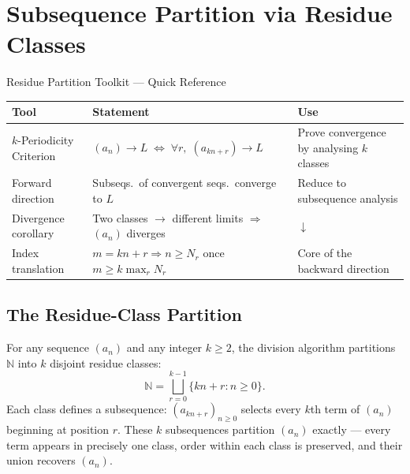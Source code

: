 
\section{Subsequence Partition via Residue Classes}
\label{sec:residue-partition}

\begin{toolkitbox}{Residue Partition Toolkit --- Quick Reference}
\small
\begin{tabular}{l l l}
\toprule
\textbf{Tool} & \textbf{Statement} & \textbf{Use} \\
\midrule
$k$-Periodicity Criterion
  & $(a_n)\to L \;\Leftrightarrow\; \forall r,\;(a_{kn+r})\to L$
  & Prove convergence by analysing $k$ classes \\[3pt]
Forward direction
  & Subseqs.\ of convergent seqs.\ converge to $L$
  & Reduce to subsequence analysis \\[3pt]
Divergence corollary
  & Two classes $\to$ different limits $\Rightarrow$ $(a_n)$ diverges
  & \hyperref[prop:residue-divergence]{$\downarrow$} \\[3pt]
Index translation
  & $m = kn+r \Rightarrow n \geq N_r$ once $m \geq k\max_r N_r$
  & Core of the backward direction \\
\bottomrule
\end{tabular}
\end{toolkitbox}

\subsection*{The Residue-Class Partition}
\label{subsec:residue-partition-def}

For any sequence $(a_n)$ and any integer $k \geq 2$, the division algorithm
partitions $\mathbb{N}$ into $k$ disjoint residue classes:
\[
  \mathbb{N} = \bigsqcup_{r=0}^{k-1} \{kn + r : n \geq 0\}.
\]
Each class defines a subsequence: $(a_{kn+r})_{n \geq 0}$ selects every
$k$th term of $(a_n)$ beginning at position $r$. These $k$ subsequences
partition $(a_n)$ exactly --- every term appears in precisely one class,
order within each class is preserved, and their union recovers $(a_n)$.

